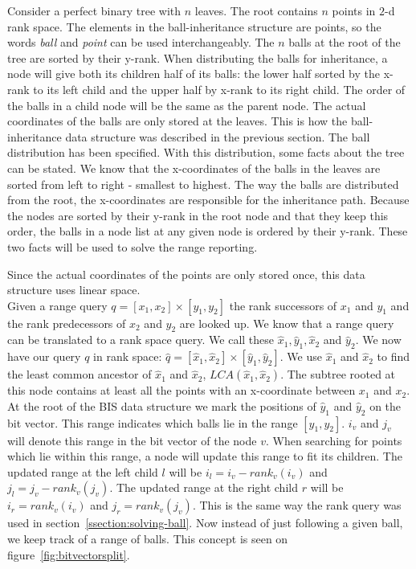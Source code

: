 Consider a perfect binary tree with $n$ leaves. The root contains $n$ points in $2$-d rank space. The elements in the ball-inheritance structure are points, so the words \emph{ball} and \emph{point} can be used interchangeably. The $n$ balls at the root of the tree are sorted by their y-rank. When distributing the balls for inheritance, a node will give both its children half of its balls: the lower half sorted by the x-rank to its left child and the upper half by x-rank to its right child. The order of the balls in a child node will be the same as the parent node. The actual coordinates of the balls are only stored at the leaves. This is how the ball-inheritance data structure was described in the previous section. The ball distribution has been specified. With this distribution, some facts about the tree can be stated. We know that the x-coordinates of the balls in the leaves are sorted from left to right - smallest to highest. The way the balls are distributed from the root, the x-coordinates are responsible for the inheritance path. Because the nodes are sorted by their y-rank in the root node and that they keep this order, the balls in a node list at any given node is ordered by their y-rank. These two facts will be used to solve the range reporting.

\noindent Since the actual coordinates of the points are only stored once, this data structure uses linear space. \\

Given a range query $q = [x_1, x_2] \times [y_1, y_2]$ the rank successors of $x_1$ and $y_1$ and the rank predecessors of $x_2$ and $y_2$ are looked up. We know that a range query can be translated to a rank space query. We call these $\hat{x}_1, \hat{y}_1, \hat{x}_2$ and $\hat{y}_2$. We now have our query $q$ in rank space: $\hat{q} = [\hat{x}_1, \hat{x}_2] \times [\hat{y}_1, \hat{y}_2]$. We use $\hat{x}_1$ and $\hat{x}_2$ to find the least common ancestor of $\hat{x}_1$ and $\hat{x}_2$, $LCA(\hat{x}_1, \hat{x}_2)$. The subtree rooted at this node contains at least all the points with an x-coordinate between $x_1$ and $x_2$. \\

At the root of the BIS data structure we mark the positions of $\hat{y}_1$ and $\hat{y}_2$ on the bit vector. This range indicates which balls lie in the range $[y_1, y_2]$. $i_v$ and $j_v$ will denote this range in the bit vector of the node $v$. When searching for points which lie within this range, a node will update this range to fit its children. The updated range at the left child $l$ will be $i_l = i_v - rank_v(i_v)$ and $j_l = j_v - rank_v(j_v)$. The updated range at the right child $r$ will be $i_r = rank_v(i_v)$ and $j_r = rank_v(j_v)$. This is the same way the rank query was used in section~\ref{ssection:solving-ball}. Now instead of just following a given ball, we keep track of a range of balls. This concept is seen on figure~\ref{fig:bitvectorsplit}. \\

